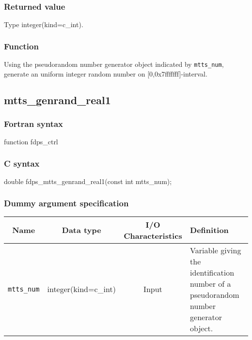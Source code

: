 \subsubsection*{Returned value}
Type integer(kind=c\_int).

\subsubsection*{Function}
Using the pseudorandom number generator object indicated by \texttt{mtts\_num}, generate an uniform integer random number on [0,0x7fffffff]-interval.
\clearpage

\subsection{mtts\_genrand\_real1}
\subsubsection*{Fortran syntax}
\begin{screen}
\begin{spverbatim}  
function fdps_ctrl%
\end{spverbatim}
\end{screen}

\subsubsection*{C syntax}
\begin{screen}
\begin{spverbatim}  
double fdps_mtts_genrand_real1(const int mtts_num);
\end{spverbatim}
\end{screen}

\subsubsection*{Dummy argument specification}
\begin{table}[h]
\begin{tabularx}{\linewidth}{cccX}
\toprule
\rowcolor{Snow2}
Name & Data type & I/O Characteristics & Definition \\
\midrule
\verb|mtts_num| & integer(kind=c\_int) & Input & Variable giving the identification number of a pseudorandom number generator object.\\
\bottomrule
\end{tabularx}
\end{table}

